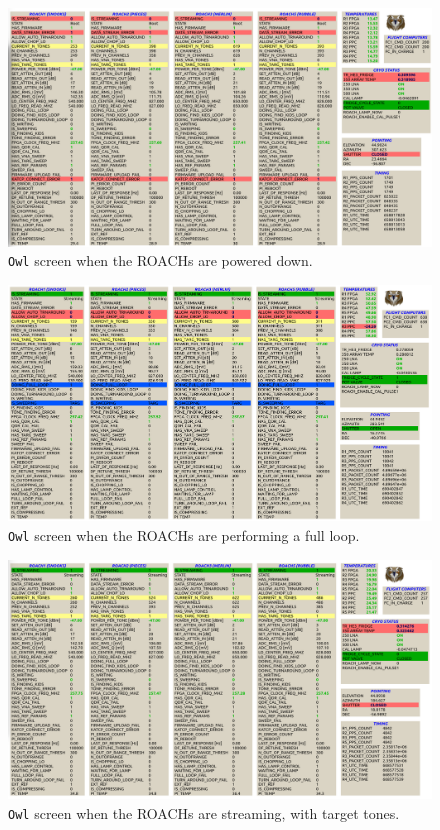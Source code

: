 \begin{figure}[hbtp]
\includegraphics[angle=90, width=\linewidth,height=\textheight,keepaspectratio]{./figures/software/roaches_off}
\caption{\texttt{Owl} screen when the ROACHs are powered down.}
\label{fig:roaches off screen}
\end{figure}

\begin{figure}[hbtp]
\includegraphics[angle=90, width=\linewidth,height=\textheight,keepaspectratio]{./figures/software/full_loop}
\caption{\texttt{Owl} screen when the ROACHs are performing a full loop.}
\label{fig:doing full loop screen}
\end{figure}

\begin{figure}[hbtp]
\includegraphics[angle=90, width=\linewidth,height=\textheight,keepaspectratio]{./figures/software/has_targ_tones}
\caption{\texttt{Owl} screen when the ROACHs are streaming, with target tones.}
\label{fig:has targ tones screen}
\end{figure}


